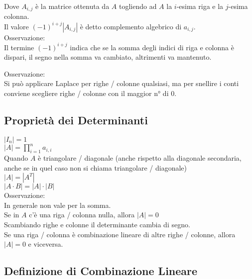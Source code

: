 \documentclass[a4paper, twoside, italian, 11pt]{book}
\newcommand{\detm}[1] {\left | #1 \right |}
\begin{document}
\noindent
Dove $A_{i,j}$ è la matrice ottenuta da $A$ togliendo ad $A$ la $i$-esima riga e la $j$-esima colonna. \\

\noindent
Il valore $(-1)^{i+j} \detm{A_{i,j}}$ è detto complemento algebrico di $a_{i,j}$. \\

\noindent
Osservazione: \\
Il termine $(-1)^{i+j}$ indica che se la somma degli indici di riga e colonna è dispari, il segno nella somma va cambiato, altrimenti va mantenuto.

\noindent
Osservazione: \\
Si può applicare Laplace per righe / colonne qualsiasi, ma per snellire i conti conviene scegliere righe / colonne con il maggior n° di $0$.


\subsection{Proprietà dei Determinanti}

$\detm{I_n} = 1$ \\

\noindent
$\detm A = \prod_{i=1}^n a_{i,i}$ \\

\noindent
Quando $A$ è triangolare / diagonale (anche rispetto alla diagonale secondaria, anche se in quel caso non si chiama triangolare / diagonale) \\

\noindent
$\detm A = \detm{A^T}$ \\

\noindent
$\detm{A \cdot B} = \detm A \cdot \detm B$ \\

\noindent
Osservazione: \\
In generale non vale per la somma. \\

\noindent
Se in $A$ c'è una riga / colonna nulla, allora $\detm A = 0$ \\

\noindent
Scambiando righe e colonne %
il determinante cambia di segno. \\

\noindent
Se una riga / colonna è combinazione lineare di altre righe / colonne, allora $\detm A = 0$ e viceversa.


\subsection{Definizione di Combinazione Lineare}
\end{document}
